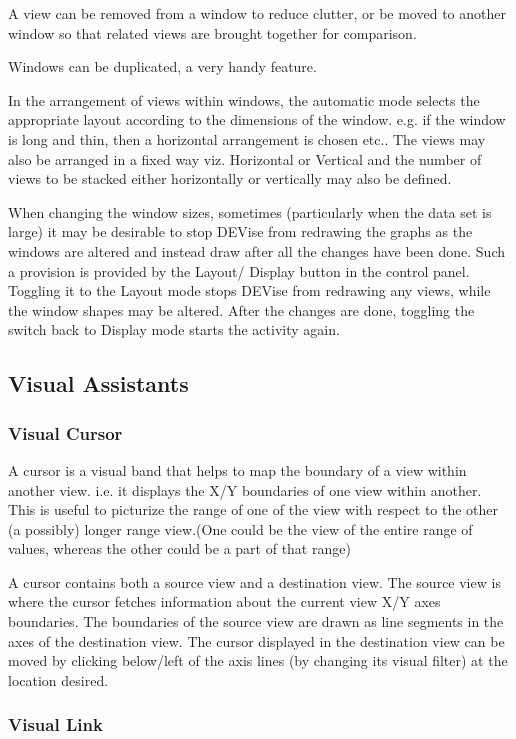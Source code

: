 A view can be removed from a window to reduce clutter, or be moved to another window so that related views are brought together for comparison. 

Windows can be duplicated, a very handy feature.

In the arrangement of views within windows, the automatic mode selects the appropriate layout according to the dimensions of the window. e.g. if the window is long and thin, then a horizontal arrangement is chosen etc.. The views may also be arranged in a fixed way viz. Horizontal or Vertical and the number of views to be stacked either horizontally or vertically may also be defined.

When changing the window sizes, sometimes (particularly when the data set is large) it may be desirable to stop DEVise from redrawing the graphs as the windows are altered and instead draw after all the changes have been done. Such a provision is provided by the Layout/ Display button in the control panel. Toggling it to the Layout mode stops DEVise from redrawing any views, while the window shapes may be altered. After the changes are done, toggling the switch back to Display mode starts the activity again.

\subsection{Visual Assistants}

\subsubsection{Visual Cursor}

A cursor is a visual band that helps to map the boundary of a view within another view.  i.e. it displays the X/Y boundaries of one view within another. This is useful to picturize the range of one of the  view with respect to the other (a possibly) longer range view.(One could be the view of the entire range of values, whereas the other could be a part of that range) 

A cursor contains both a source view and a destination view. The source view is where the cursor fetches information about the current view X/Y axes boundaries. The boundaries of the source view are drawn as line segments in the axes of the destination view. The cursor displayed in the destination view can be moved by clicking below/left of  the axis lines  (by changing its visual filter) at the location desired.


\subsubsection{Visual Link}

